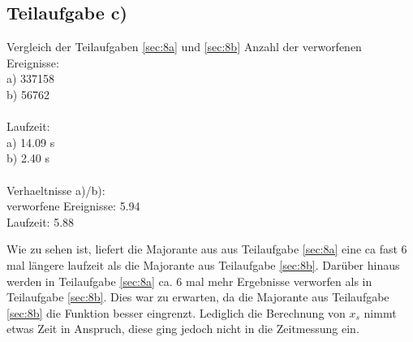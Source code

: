 \subsection{Teilaufgabe c)} \label{sec:8c}
\begin{console1}{Vergleich der Teilaufgaben \ref{sec:8a} und \ref{sec:8b}}
  Anzahl der verworfenen Ereignisse: \\
  a) 337158 \\
  b) 56762 \\
  \\
  Laufzeit: \\
  a) 14.09 s \\
  b) 2.40 s \\
  \\
  Verhaeltnisse a)/b): \\
  verworfene Ereignisse: 5.94 \\
  Laufzeit: 5.88 \\
\end{console1}
Wie zu sehen ist, liefert die Majorante aus aus Teilaufgabe \ref{sec:8a} eine ca fast 6 mal längere laufzeit als die Majorante aus Teilaufgabe \ref{sec:8b}.
Darüber hinaus werden in Teilaufgabe \ref{sec:8a} ca. 6 mal mehr Ergebnisse verworfen als in Teilaufgabe \ref{sec:8b}.
Dies war zu erwarten, da die Majorante aus Teilaufgabe \ref{sec:8b} die Funktion besser eingrenzt.
Lediglich die Berechnung von $x_s$ nimmt etwas Zeit in Anspruch, diese ging jedoch nicht in die Zeitmessung ein.
